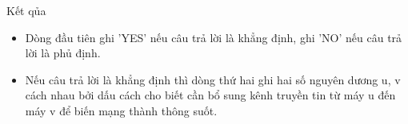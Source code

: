 Kết qủa
\begin{itemize}
	\item     Dòng đầu tiên ghi 'YES' nếu câu trả lời là khẳng định, ghi 'NO' nếu câu trả lời là phủ định.   
	\item     Nếu câu trả lời là khẳng định thì dòng thứ hai ghi hai số nguyên dương u, v cách nhau bởi dấu cách cho biết cần bổ sung kênh truyền tin từ máy u đến máy v để biến mạng thành thông suốt.   
\end{itemize}